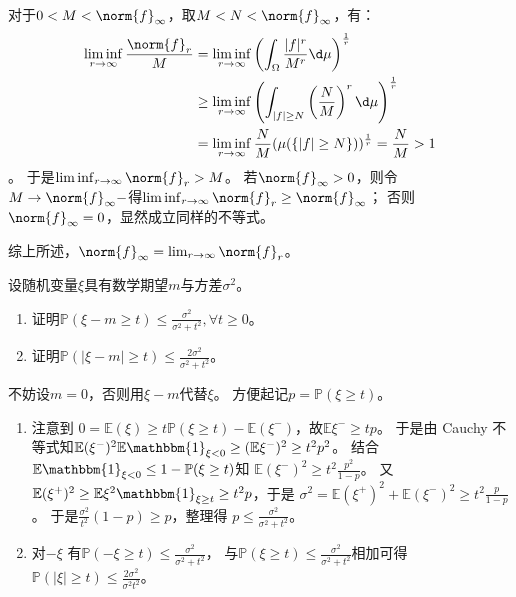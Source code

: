 \documentclass{ctexart}
\begin{document}
\begin{solution}
\begin{enumerate}
      对于\(0<M<\norm{f}_{\infty} \)，取\(M<N<\norm{f}_{\infty} \)，有：
      \begin{equation}\label{equ:4}
        \begin{aligned}
          \liminf_{r \to \infty} \frac{\norm{f}_{r}}{M}&= \liminf_{r \to \infty} \left(\int_{\Omega} \frac{|f|^r}{M^r} \d \mu\right)^{  \frac{1}{r} }\\
          & \geq  \liminf_{r \to \infty} \left(\int_{|f| \geq N} \left(\frac{N}{M}\right)^r \d \mu \right)^{\frac{1}{r}}\\
          &= \liminf_{r \to \infty} \frac{N}{M} (\mu(\{|f| \geq N\}))^{\frac{1}{r}} = \frac{N}{M} >1
        \end{aligned}
      \end{equation}。
      于是\(\liminf_{r \to \infty} \norm{f}_{r} > M \)。
      若\(\norm{f}_{\infty}>0 \)，则令\(M \to \norm{f}_{\infty}- \)得\(\liminf_{r \to \infty} \norm{f}_{r} \geq \norm{f}_{\infty} \)；
      否则\(\norm{f}_{\infty} = 0 \)，显然成立同样的不等式。

      综上所述，\(\norm{f}_{\infty} = \lim_{r \to \infty} \norm{f}_{r} \)。
  \end{enumerate}
\end{solution}
\begin{problem}\label{pro:3.6.33}
  设随机变量\(\xi \)具有数学期望\(m \)与方差\(\sigma^2 \)。
  \begin{enumerate}
    \item 证明\(\mathbb{P}(\xi - m \geq t) \leq \frac{\sigma^2}{\sigma^2 + t^2}, \forall t \geq 0 \)。
    \item 证明\(\mathbb{P}(|\xi - m| \geq t) \leq \frac{2\sigma^2}{\sigma^2 + t^2} \)。
  \end{enumerate}
\end{problem}
\begin{solution}
  不妨设\(m=0 \)，否则用\(\xi-m \)代替\(\xi \)。
  方便起记\(p=\mathbb{P}(\xi \geq t) \)。
  \begin{enumerate}
    \item \label{it:2} 注意到 \(0=\mathbb{E}(\xi)\geq t \mathbb{P}(\xi \geq t) - \mathbb{E}(\xi^{-}) \)，故\(\mathbb{E} \xi^{-} \geq t p \)。
      于是由 Cauchy 不等式知\(\mathbb{E} (\xi^{-})^2 \mathbb{E} \mathbbm{1}_{\xi<0} \geq (\mathbb{E} \xi^{-})^2 \geq t^2 p^2 \)。
      结合\(\mathbb{E} \mathbbm{1}_{\xi<0} \leq 1-\mathbb{P}(\xi \geq t) \)知 \(\mathbb{E} (\xi^{-})^2 \geq t^2 \frac{p^2}{1- p} \)。
      又\(\mathbb{E} (\xi^{+})^2 \geq \mathbb{E} \xi^2 \mathbbm{1}_{\xi \geq t} \geq t^2 p \)，于是
      \(\sigma^2 = \mathbb{E} (\xi^{+})^2 + \mathbb{E} (\xi^{-})^2 \geq t^2  \frac{p}{1-p} \)。
      于是\(\frac{\sigma^2}{t^2}(1-p) \geq p\)，整理得
      \(p \leq \frac{\sigma^2}{\sigma^2 + t^2} \)。
    \item 对\(-\xi \) 有\(\mathbb{P}(-\xi \geq t) \leq \frac{\sigma^2}{\sigma^2 + t^2} \)，
      与\(\mathbb{P}(\xi \geq t ) \leq \frac{\sigma^2}{\sigma^2 + t^2} \)相加可得\(\mathbb{P}(|\xi| \geq t) \leq \frac{2 \sigma^2}{\sigma^2 t^2} \)。
  \end{enumerate}
\end{solution}
\end{document}
